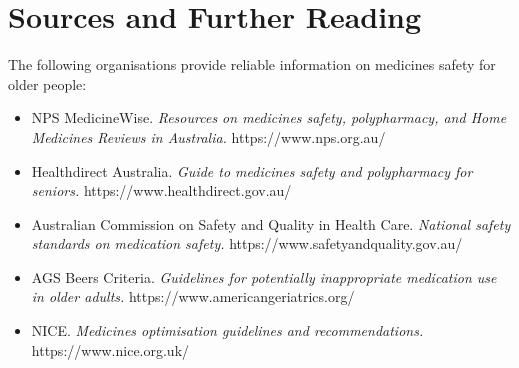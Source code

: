 \section*{Sources and Further Reading}
The following organisations provide reliable information on medicines safety for older people:

\begin{itemize}
    \item NPS MedicineWise. \textit{Resources on medicines safety, polypharmacy, and Home Medicines Reviews in Australia.} https://www.nps.org.au/
    \item Healthdirect Australia. \textit{Guide to medicines safety and polypharmacy for seniors.} https://www.healthdirect.gov.au/
    \item Australian Commission on Safety and Quality in Health Care. \textit{National safety standards on medication safety.} https://www.safetyandquality.gov.au/
    \item AGS Beers Criteria. \textit{Guidelines for potentially inappropriate medication use in older adults.} https://www.americangeriatrics.org/
    \item NICE. \textit{Medicines optimisation guidelines and recommendations.} https://www.nice.org.uk/
\end{itemize}
